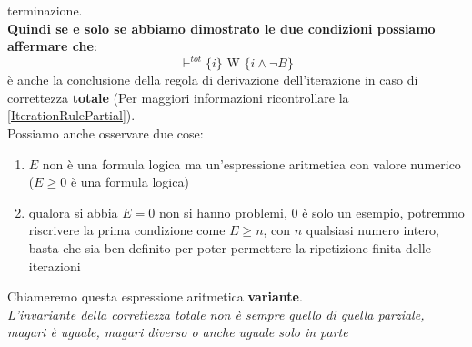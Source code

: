 				      				terminazione. \\
				      				\textbf{Quindi se e solo se abbiamo dimostrato le due condizioni possiamo affermare che}:
				      				\[\vdash^{tot}\{i\}\mbox{ W }\{i\land\neg B\}\]
				      				è anche la conclusione della regola di derivazione dell'iterazione in caso
				      				di correttezza \textbf{totale} (Per maggiori informazioni ricontrollare la \ref{IterationRulePartial}).\\
				      				Possiamo anche osservare due cose:
				      				\begin{enumerate}
				      					\item $E$ non è una formula logica ma un'espressione aritmetica con valore
				      					      numerico ($E\geq 0$ è una formula logica)
				      					\item qualora si abbia $E=0$ non si hanno problemi, $0$ è solo un esempio,
				      					      potremmo riscrivere la prima condizione come $E\geq n$, con $n$ qualsiasi
				      					      numero intero, basta che sia ben definito per poter permettere la ripetizione
				      					      finita delle iterazioni
				      				\end{enumerate}
				      				Chiameremo questa espressione aritmetica \textbf{variante}.\\
				      				\textit{L'invariante della correttezza totale non è sempre quello di quella
				      				parziale, magari è uguale, magari diverso o anche uguale solo in parte}
